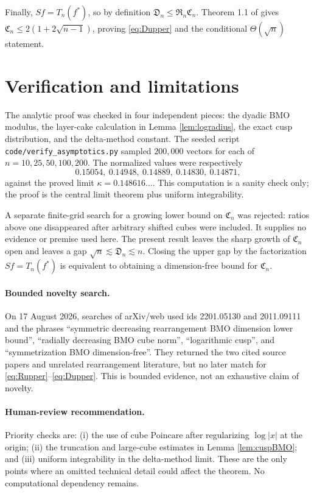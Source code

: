 \documentclass[11pt]{article}
\newcommand{\1}{\mathbf 1}
\begin{document}
Finally, $Sf=T_n(f^*)$, so by definition
$\mathfrak D_n\le\mathfrak R_n\mathfrak C_n$.  Theorem 1.1 of
\cite{bounds} gives
$\mathfrak C_n\le2(1+2\sqrt{n-1})$, proving \eqref{eq:Dupper} and the
conditional $\Theta(\sqrt n)$ statement.

\section{Verification and limitations}

The analytic proof was checked in four independent pieces: the dyadic BMO
modulus, the layer-cake calculation in Lemma \ref{lem:logradius}, the exact
cusp distribution, and the delta-method constant.  The seeded script
\texttt{code/verify\_asymptotics.py} sampled $200{,}000$ vectors for each of
$n=10,25,50,100,200$.  The normalized values were respectively
\[
 0.15054,\ 0.14948,\ 0.14889,\ 0.14830,\ 0.14871,
\]
against the proved limit $\kappa=0.148616\ldots$.  This computation is a
sanity check only; the proof is the central limit theorem plus uniform
integrability.

A separate finite-grid search for a growing lower bound on
$\mathfrak C_n$ was rejected: ratios above one disappeared after arbitrary
shifted cubes were included.  It supplies no evidence or premise used here.
The present result leaves the sharp growth of $\mathfrak C_n$ open and leaves
a gap $\sqrt n\lesssim\mathfrak D_n\lesssim n$.  Closing the upper gap by
the factorization $Sf=T_n(f^*)$ is equivalent to obtaining a dimension-free
bound for $\mathfrak C_n$.

\paragraph{Bounded novelty search.}
On 17 August 2026, searches of arXiv/web used ids 2201.05130 and 2011.09111
and the phrases ``symmetric decreasing rearrangement BMO dimension lower
bound'', ``radially decreasing BMO cube norm'', ``logarithmic cusp'', and
``symmetrization BMO dimension-free''.  They returned the two cited source
papers and unrelated rearrangement literature, but no later match for
\eqref{eq:Rupper}--\eqref{eq:Dupper}.  This is bounded evidence, not an
exhaustive claim of novelty.

\paragraph{Human-review recommendation.}
Priority checks are: (i) the use of cube Poincare after regularizing
$\log|x|$ at the origin; (ii) the truncation and large-cube estimates in
Lemma \ref{lem:cuspBMO}; and (iii) uniform integrability in the delta-method
limit.  These are the only points where an omitted technical detail could
affect the theorem.  No computational dependency remains.
\end{document}
